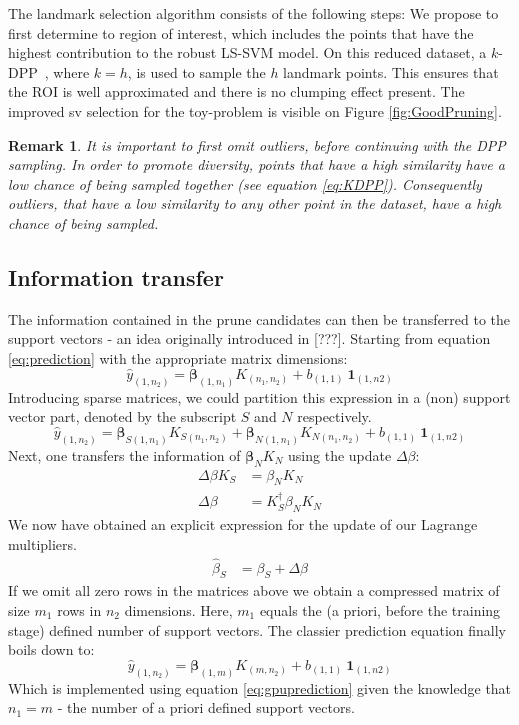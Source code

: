 \documentclass[preprint,12pt]{elsarticle}
\newtheorem*{remark}{Remark}
\begin{document}
The landmark selection algorithm consists of the following steps:
We propose to first determine to region of interest, which includes the points that have the highest contribution to the robust LS-SVM model. On this reduced dataset, a $k$-DPP~\cite{kulesza2011k}, where $k = h$, is used to sample the $h$ landmark points. This ensures that the ROI is well approximated and there is no clumping effect present. The improved sv selection for the toy-problem is visible on Figure \ref{fig:GoodPruning}.

\begin{remark}
It is important to first omit outliers, before continuing with the DPP sampling. In order to promote diversity, points that have a high similarity have a low chance of being sampled together (see equation \eqref{eq:KDPP}). Consequently outliers, that have a low similarity to any other point in the dataset, have a high chance of being sampled.
\end{remark}



\subsection{Information transfer}
 The information contained in the prune candidates can then be transferred to the support vectors - an idea originally introduced in [???]. Starting from equation \ref{eq:prediction} with the appropriate matrix dimensions:
\begin{equation}
\hat{y}_{(1,n_2) } = \mathbf{\beta}_{(1,n_1)} K_{(n_1, n_2)} + b_{(1,1)} \ \mathbf{1}_{(1, n2)} 
\end{equation}
Introducing sparse matrices, we could partition this expression in a (non) support vector part, denoted by the subscript $S$ and $N$ respectively.
\begin{equation}
\hat{y}_{(1,n_2) } = \mathbf{\beta}_{S(1,n_1)} K_{S(n_1, n_2)} + \mathbf{\beta}_{N(1,n_1)} K_{N(n_1, n_2)} + b_{(1,1)} \ \mathbf{1}_{(1, n2)}
\end{equation}
Next, one transfers the information of $\mathbf{\beta}_{N} K_{N}$ using the update $\Delta\beta$: 
\begin{align}
\Delta \beta K_S &= \beta_N K_N  \\
\Delta \beta &= K^\dagger_S  \beta_N K_N
\end{align}
We now have obtained an explicit expression for the update of our Lagrange multipliers. 
\begin{align}
\hat{\beta}_S &= \beta_S + \Delta\beta
\end{align}
If we omit all zero rows in the matrices above we obtain a compressed matrix of size $m_1$ rows in $n_2$ dimensions. Here, $m_1$ equals the (a priori, before the training stage) defined number of support vectors. The classier prediction equation finally boils down to:
\begin{equation}
\hat{y}_{(1,n_2) } = \mathbf{\beta}_{(1,m)} K_{(m, n_2)} + b_{(1,1)} \ \mathbf{1}_{(1, n2)} 
\end{equation}
Which is implemented using equation \ref{eq:gpuprediction} given the knowledge that $n_1 = m$ - the number of a priori defined support vectors. \\
\end{document}
